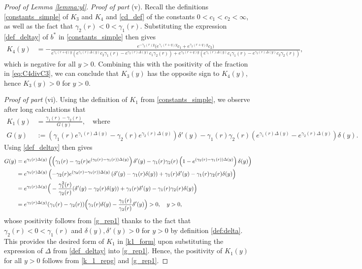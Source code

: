 \documentclass[11pt]{article} %
\numberwithin{komcounter}{section}
\numberwithin{equation}{section}
\numberwithin{theorem}{section}
\begin{document}
\begin{proof}[Proof of Lemma \ref{lemma:yl}]
\vspace{1mm}
{\it Proof of part} (v). 
Recall the definitions \eqref{constants_simple} of $K_3$ and $K_4$ and \eqref{cd_def} of the constants $0 < c_1 <  c_2 < \infty$, as well as the fact that $\gamma_2(r) < 0 < \gamma_1(r)$. 
Substituting the expression \eqref{def_deltay} of $b^*$ in \eqref{constants_simple} then gives
\begin{align*}
K_4(y) &= -\frac{e^{-\gamma_2(r)y} \big(e^{\gamma_1(r+q)y} c_1 + e^{\gamma_2(r+q)y} c_2 \big)
    }
    {
    e^{\gamma_1(r+q)y} \left( 
    e^{\gamma_1(r)\Delta(y)} c_2\gamma_1(r) - e^{\gamma_2(r)\Delta(y)} c_1\gamma_2(r)
    \right) 
    + e^{\gamma_2(r+q)y} \left(
    e^{\gamma_1(r)\Delta(y)} c_1\gamma_1(r) - e^{\gamma_2(r)\Delta(y)} c_2\gamma_2(r) \right)
    },
\end{align*}
which is negative for all $y > 0$. 
Combining this with the positivity of the fraction in \eqref{eq:C4divC3}, we can conclude that $K_3(y)$ has the opposite sign to $K_4(y)$, hence $K_3(y) > 0$ for $y > 0$.

\vspace{1mm}
{\it Proof of part} (vi). 
Using the definition of $K_1$ from \eqref{constants_simple}, we observe after long calculations that 
\begin{align}
K_1(y) &= \frac{\gamma_1(r)-\gamma_2(r)}{G(y)}, \quad \text{where} \quad 
\label{k_1_repg}\\ 
G(y)&:= \left( \gamma_1(r) e^{\gamma_1(r)\Delta(y)}  - \gamma_2(r) e^{\gamma_2(r)\Delta(y)}\right)\delta'(y) - \gamma_1(r)\gamma_2(r)\left(e^{\gamma_1(r) \Delta(y)} - e^{\gamma_2(r)\Delta(y)} \right) \delta(y) 
\label{eq:G_y}.
\end{align}
Using \eqref{def_deltay} then gives 
\begin{align}
G(y)
&=e^{\gamma_1(r)\Delta(y)}\left(\left( \gamma_1(r)  - \gamma_2(r) e^{(\gamma_2(r)-\gamma_1(r))\Delta(y)}\right)\delta'(y) - \gamma_1(r)\gamma_2(r)\left(1 - e^{(\gamma_2(r)-\gamma_1(r))\Delta(y)} \right) \delta(y)\right)\notag\\
&=e^{\gamma_1(r)\Delta(y)} \left(-\gamma_2(r)e^{(\gamma_2(r)-\gamma_1(r))\Delta(y)}\left(\delta'(y)-\gamma_1(r)\delta(y)\right)+\gamma_1(r)\delta'(y)-\gamma_1(r)\gamma_2(r)\delta(y)\right)\notag\\
&=e^{\gamma_1(r)\Delta(y)}\Big(-\frac{\gamma_1^2(r)}{\gamma_2(r)}(\delta'(y)-\gamma_2(r)\delta(y))+\gamma_1(r)\delta'(y)-\gamma_1(r)\gamma_2(r)\delta(y)\Big)\notag\\
&=e^{\gamma_1(r)\Delta(y)}(\gamma_1(r)-\gamma_2(r))\Big(\gamma_1(r)\delta(y)-\frac{\gamma_1(r)}{\gamma_2(r)}\delta'(y)\Big) > 0, \quad y > 0,
\label{g_rep1} 
\end{align}
whose positivity follows from \eqref{g_rep1} thanks to the fact that $\gamma_2(r) < 0 < \gamma_1(r)$ and $\delta(y), \delta'(y) > 0$ for $y>0$ by definition \eqref{def:delta}.
This provides the desired form of $K_1$ in \eqref{k1_form} upon substituting the expression of $\Delta$ from \eqref{def_deltay} into \eqref{g_rep1}.
Hence, the positivity of $K_1(y)$ for all $y>0$ follows from \eqref{k_1_repg} and \eqref{g_rep1}.


\end{proof}
\end{document}

